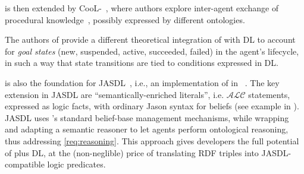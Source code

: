 \documentclass[
]{ceurart}
\begin{document}
\agentspeakdl{} is then extended by CooL-\agentspeak{}~\cite{DBLP:journals/wias/MascardiABBR14},
where authors explore inter-agent exchange of procedural knowledge~\cite{DBLP:conf/dalt/AnconaM03},
possibly expressed by different ontologies.
%

The authors of \cite{DBLP:conf/iat/HalacED11} provide a different theoretical integration of \agentspeak{} with \ac{DL}
to account for \emph{goal states}
(new, suspended, active, succeeded, failed)
in the agent's lifecycle,
in such a way that state transitions are tied to conditions expressed in \ac{DL}.
%


\agentspeakdl{} is also the foundation for JASDL~\cite{DBLP:conf/dalt/KlapiscakB08},
i.e., an implementation of \agentspeakdl{} in \jason{}~\cite{bordini2007programming}.
%
The key extension in JASDL are ``semantically-enriched literals'', 
i.e. $\mathcal{ALC}$ statements, 
expressed as logic facts,
with ordinary Jason syntax for beliefs
(see example in ).
%
%
JASDL uses \jason{}'s standard belief-base management mechanisms,
while wrapping and adapting a semantic reasoner to let agents perform ontological reasoning,
thus addressing \ref{req:reasoning}.
%
This approach gives developers the full potential of \jason{} plus \ac{DL}, 
at the (non-neglible) price of translating \ac{RDF} triples into JASDL-compatible logic predicates.
%

\end{document}
